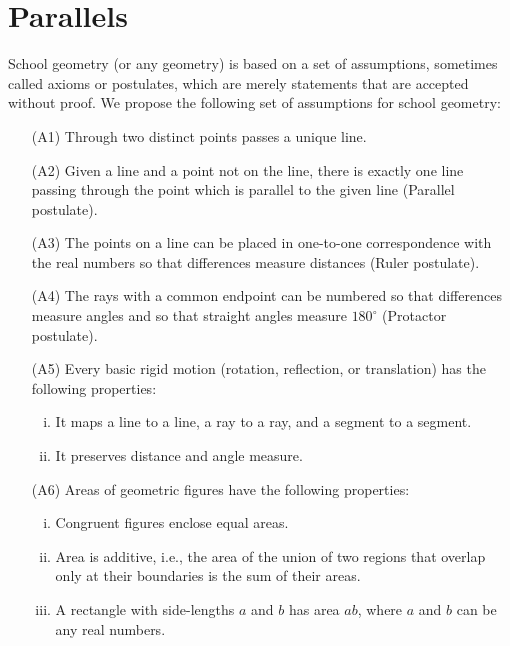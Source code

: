 \newpage

\section{Parallels}
School geometry (or any geometry) is based on a set of assumptions, sometimes called axioms or postulates, which are merely statements that are accepted without proof.  We propose the following set of assumptions for school geometry:  
\begin{itemize}
\item[(A1)] Through two distinct points passes a unique line.
\item[(A2)] Given a line and a point not on the line, there is exactly one line passing through the point which is parallel to the given line (Parallel postulate).
\item[(A3)] The points on a line can be placed in one-to-one correspondence with the real numbers so that differences measure distances (Ruler postulate).  
\item[(A4)] The rays with a common endpoint can be numbered so that differences measure angles and so that straight angles measure $180^\circ$ (Protactor postulate). 
\item[(A5)] Every basic rigid motion (rotation, reflection, or translation) has the following properties:
\begin{enumerate}[(i)]
\item It maps a line to a line, a ray to a ray, and a segment to a segment.
\item It preserves distance and angle measure.
\end{enumerate}
\item [(A6)] Areas of geometric figures have the following properties: 
\begin{enumerate}[(i)]
\item Congruent figures enclose equal areas.
\item Area is additive, i.e., the area of the union of two regions that overlap only at their boundaries is the sum of their areas. 
\item A rectangle with side-lengths $a$ and $b$ has area $ab$, where $a$ and $b$ can be any real numbers.
\end{enumerate}
\end{itemize}

